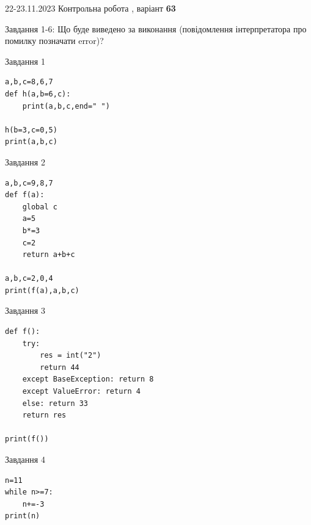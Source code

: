 \documentclass[12pt, ukrainian]{article}
\begin{document}
{{22-23.11.2023 Контрольна робота , варіант  \No \textbf { 63 }\par}}
{

Завдання 1-6: Що буде виведено за виконання (повідомлення інтерпретатора про помилку позначати error)?


\begin{minipage}[t]{9.7cm}                
{\begin{center}Завдання {1}\end{center}}
\begin{verbatim}
a,b,c=8,6,7
def h(a,b=6,c):
    print(a,b,c,end=" ")

h(b=3,c=0,5)
print(a,b,c)
\end{verbatim}     
\end{minipage}
\vline \hspace{8mm}
\begin{minipage}[t]{8.0cm}                
{\begin{center}Завдання {2}\end{center}}
\begin{verbatim}
a,b,c=9,8,7
def f(a):
    global c
    a=5
    b*=3
    c=2
    return a+b+c

a,b,c=2,0,4
print(f(a),a,b,c)
\end{verbatim}     
\end{minipage}

\vspace{15mm}
\begin{minipage}[t]{9.7cm}                
{\begin{center}Завдання {3}\end{center}}
\begin{verbatim}
def f():
    try:
        res = int("2")
        return 44
    except BaseException: return 8
    except ValueError: return 4
    else: return 33
    return res

print(f())
\end{verbatim}     
\end{minipage}
\vline \hspace{8mm}
\begin{minipage}[t]{8.0cm}                
{\begin{center}Завдання {4}\end{center}}
\begin{verbatim}
n=11
while n>=7:
    n+=-3
print(n)
\end{verbatim}     
\end{minipage}

}
\end{document}
